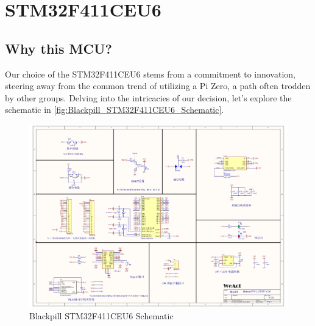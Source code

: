 \section{STM32F411CEU6}
\subsection{Why this MCU?}
Our choice of the STM32F411CEU6 stems from a commitment to innovation, steering away from the common trend of utilizing a Pi Zero, a path often trodden by other groups. Delving into the intricacies of our decision, let's explore the schematic in \autoref{fig:Blackpill_STM32F411CEU6_Schematic}.
\begin{figure}[H]
    \centering
    \includegraphics[width=1\linewidth]{img//blackpill/original-schematic-STM32F411CEU6_WeAct_Black_Pill_V2.0.pdf}
    \caption{Blackpill STM32F411CEU6 Schematic}
    \label{fig:Blackpill_STM32F411CEU6_Schematic}
\end{figure}
